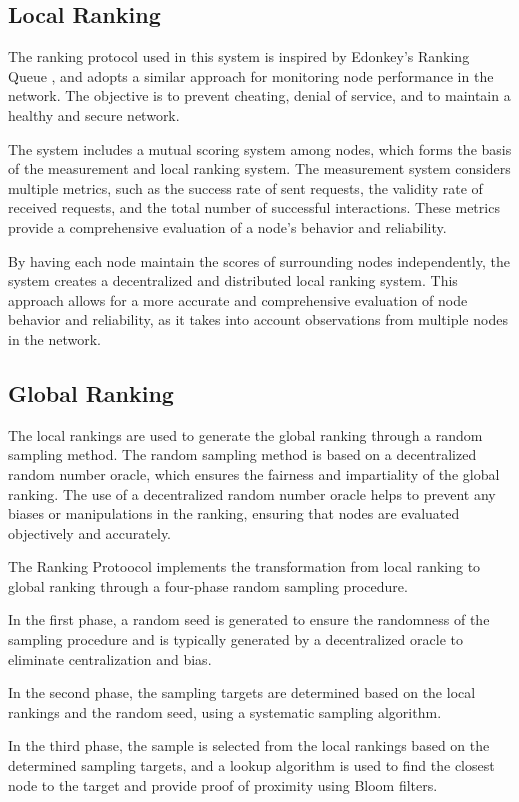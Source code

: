 \documentclass[twocolumn]{article}
\begin{document}
\subsection{Local Ranking}
The ranking protocol used in this system is inspired by Edonkey's Ranking Queue \cite{Edonkey}, and adopts a similar approach for monitoring node performance in the network. The objective is to prevent cheating, denial of service, and to maintain a healthy and secure network.

The system includes a mutual scoring system among nodes, which forms the basis of the measurement and local ranking system. The measurement system considers multiple metrics, such as the success rate of sent requests, the validity rate of received requests, and the total number of successful interactions. These metrics provide a comprehensive evaluation of a node's behavior and reliability.

By having each node maintain the scores of surrounding nodes independently, the system creates a decentralized and distributed local ranking system. This approach allows for a more accurate and comprehensive evaluation of node behavior and reliability, as it takes into account observations from multiple nodes in the network.

\subsection{Global Ranking}
The local rankings are used to generate the global ranking through a random sampling method. The random sampling method is based on a decentralized random number oracle, which ensures the fairness and impartiality of the global ranking. The use of a decentralized random number oracle helps to prevent any biases or manipulations in the ranking, ensuring that nodes are evaluated objectively and accurately.

The Ranking Protoocol implements the transformation from local ranking to global ranking through a four-phase random sampling procedure.

In the first phase, a random seed is generated to ensure the randomness of the sampling procedure and is typically generated by a decentralized oracle to eliminate centralization and bias.

In the second phase, the sampling targets are determined based on the local rankings and the random seed, using a systematic sampling algorithm.

In the third phase, the sample is selected from the local rankings based on the determined sampling targets, and a lookup algorithm is used to find the closest node to the target and provide proof of proximity using Bloom filters.
\end{document}
